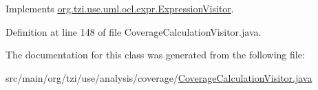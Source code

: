Implements \hyperlink{interfaceorg_1_1tzi_1_1use_1_1uml_1_1ocl_1_1expr_1_1_expression_visitor_a10d2caca63601933097076b5306fc715}{org.\-tzi.\-use.\-uml.\-ocl.\-expr.\-Expression\-Visitor}.



Definition at line 148 of file Coverage\-Calculation\-Visitor.\-java.



The documentation for this class was generated from the following file\-:\begin{DoxyCompactItemize}
\item 
src/main/org/tzi/use/analysis/coverage/\hyperlink{_coverage_calculation_visitor_8java}{Coverage\-Calculation\-Visitor.\-java}\end{DoxyCompactItemize}

